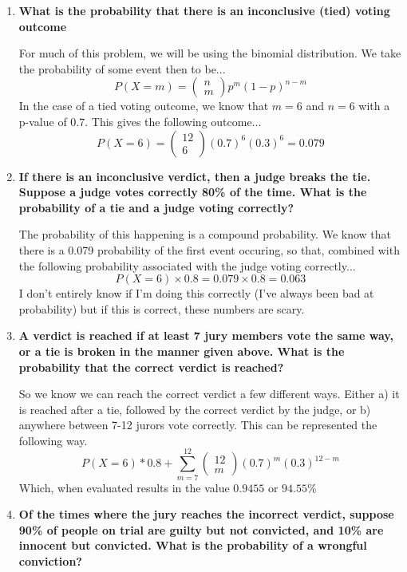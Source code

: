 \documentclass[11pt]{article}
\begin{document}
    \begin{enumerate}
        \item \textbf{What is the probability that there is an inconclusive (tied)
            voting outcome}

            For much of this problem, we will be using the binomial
            distribution. We take the probability of some event then to be...
            \[
                P(X=m)= \begin{pmatrix} n \\ m \end{pmatrix} p^m(1-p)^{n-m}
            \]
            In the case of a tied voting outcome, we know that $m=6$ and $n=6$
            with a p-value of $0.7$. This gives the following outcome...
            \[
                P(X=6)=\begin{pmatrix} 12 \\ 6 \end{pmatrix} (0.7)^6(0.3)^6 = 0.079
            \]
        \item \textbf{If there is an inconclusive verdict, then a judge breaks the tie. 
            Suppose a judge votes correctly 80\% of the time. What is the 
            probability of a tie and a judge voting correctly?}

            The probability of this happening is a compound probability. We
            know that there is a 0.079 probability of the first event occuring,
            so that, combined with the following probability associated with
            the judge voting correctly...
            \[
                P(X=6)\times 0.8 = 0.079 \times 0.8 = 0.063
            \]
            I don't entirely know if I'm doing this correctly (I've always been
            bad at probability) but if this is correct, these numbers are
            scary.
        \item \textbf{A verdict is reached if at least 7 jury members vote the same way, 
            or a tie is broken in the manner given above. What is the 
            probability that the correct verdict is reached?}

            So we know we can reach the correct verdict a few different ways.
            Either a) it is reached after a tie, followed by the correct
            verdict by the judge, or b) anywhere between 7-12 jurors vote
            correctly. This can be represented the following way.
            \[
                P(X=6) * 0.8 + \sum^{12}_{m=7} \begin{pmatrix} 12 \\ m \end{pmatrix}
                (0.7)^m(0.3)^{12-m}
            \] 
            Which, when evaluated results in the value $0.9455$ or $94.55\%$
        \item \textbf{Of the times where the jury reaches the incorrect verdict, 
            suppose 90\% of people on trial are guilty but not convicted, 
            and 10\% are innocent but convicted. What is the probability of a
            wrongful conviction?}
            

\end{enumerate}
\end{document}
